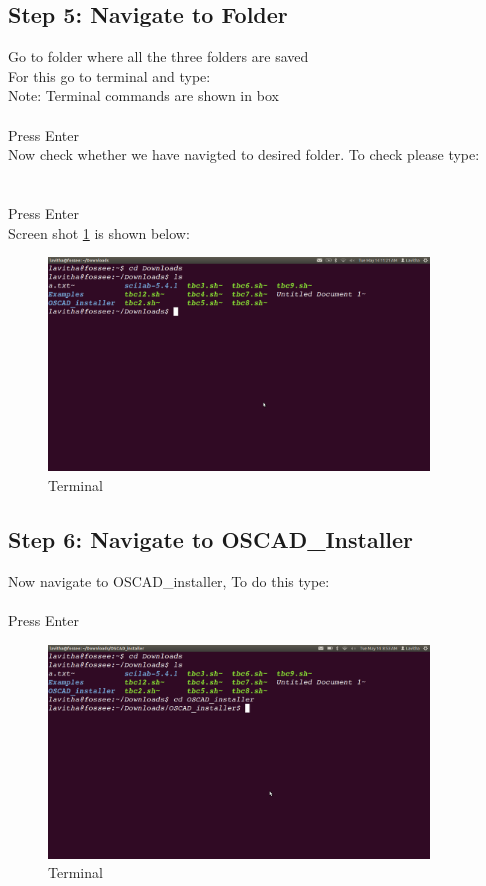 \subsection {Step 5: Navigate to Folder  }
Go to folder where all the three folders are saved\\
For this go to terminal and type:\\
Note: Terminal commands are shown in box \\
 \\
Press Enter\\
Now check whether we have navigted to desired folder. To check please type:\\\\
\\
Press Enter\\
Screen shot \ref{Terminalc} is shown below:
\begin{figure}[h!]
\centering
\includegraphics[width=0.9\textwidth]{figures/install0.png}
\caption{Terminal}
\label{Terminalc}
\end{figure}
\subsection {Step 6: Navigate to OSCAD\_Installer}
Now navigate to OSCAD\_installer, To do this type:\\
\\
Press Enter
\begin{figure}[h!]
\centering
\includegraphics[width=0.9\textwidth]{figures/installer1.png}
\caption{Terminal}
\label{Terminal}
\end{figure}

